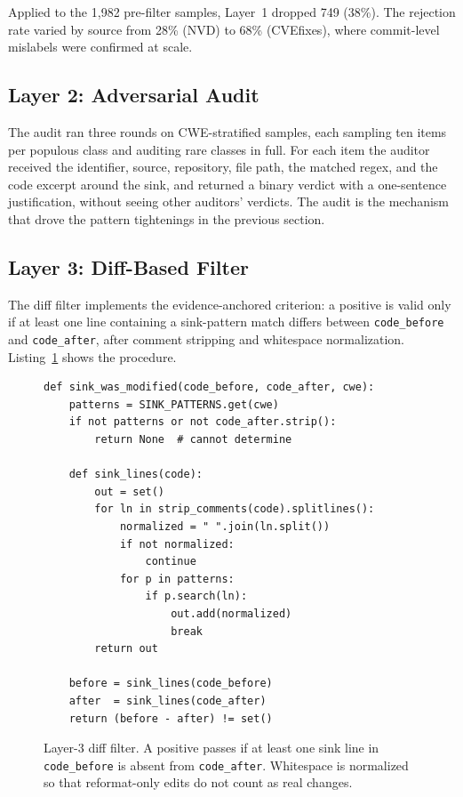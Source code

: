 Applied to the 1{,}982 pre-filter samples, Layer~1 dropped 749 (38\%). The
rejection rate varied by source from 28\% (NVD) to 68\% (CVEfixes), where
commit-level mislabels were confirmed at scale.

\subsection{Layer 2: Adversarial Audit}

The audit ran three rounds on CWE-stratified samples, each sampling ten items
per populous class and auditing rare classes in full. For each item the auditor
received the identifier, source, repository, file path, the matched regex, and
the code excerpt around the sink, and returned a binary verdict with a
one-sentence justification, without seeing other auditors' verdicts. The audit
is the mechanism that drove the pattern tightenings in the previous section.

\subsection{Layer 3: Diff-Based Filter}

The diff filter implements the evidence-anchored criterion: a positive is valid
only if at least one line containing a sink-pattern match differs between
\texttt{code\_before} and \texttt{code\_after}, after comment stripping and
whitespace normalization. Listing~\ref{lst:difffilter} shows the procedure.

\begin{figure}[H]
\begin{verbatim}
def sink_was_modified(code_before, code_after, cwe):
    patterns = SINK_PATTERNS.get(cwe)
    if not patterns or not code_after.strip():
        return None  # cannot determine

    def sink_lines(code):
        out = set()
        for ln in strip_comments(code).splitlines():
            normalized = " ".join(ln.split())
            if not normalized:
                continue
            for p in patterns:
                if p.search(ln):
                    out.add(normalized)
                    break
        return out

    before = sink_lines(code_before)
    after  = sink_lines(code_after)
    return (before - after) != set()
\end{verbatim}
\caption{Layer-3 diff filter. A positive passes if at least one sink line in
\texttt{code\_before} is absent from \texttt{code\_after}. Whitespace is
normalized so that reformat-only edits do not count as real changes.}
\label{lst:difffilter}
\end{figure}

